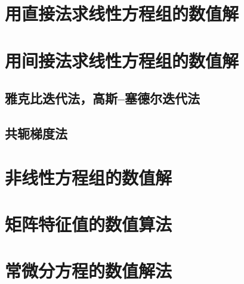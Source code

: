 \chapter{用直接法求线性方程组的数值解}



\chapter{用间接法求线性方程组的数值解}

\section{雅克比迭代法，高斯--塞德尔迭代法}




\section{共轭梯度法}

\chapter{非线性方程组的数值解}





\chapter{矩阵特征值的数值算法}


\chapter{常微分方程的数值解法}



